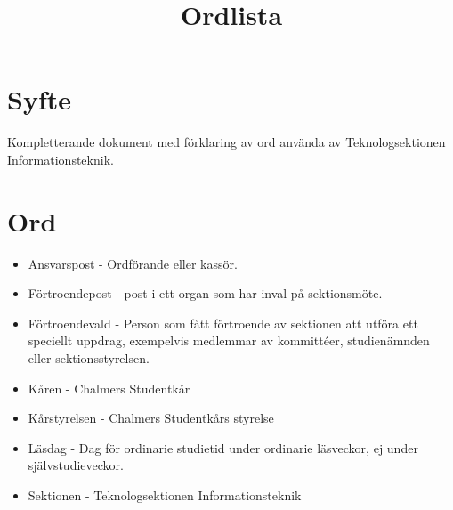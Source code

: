 \documentclass[11pt, includeaddress]{classes/cthit}
\begin{document}
\title{Ordlista}
\maketitle

\thispagestyle{empty}

\newpage

\makeheadfoot%

\setcounter{tocdepth}{2}
\setcounter{page}{1}

\section{Syfte}
Kompletterande dokument med förklaring av ord använda av Teknologsektionen Informationsteknik.

\section{Ord}
\begin{itemize}
	\item Ansvarspost - Ordförande eller kassör.
	\item Förtroendepost - post i ett organ som har inval på sektionsmöte.
	\item Förtroendevald - Person som fått förtroende av sektionen att utföra ett speciellt uppdrag, exempelvis medlemmar av kommittéer, studienämnden eller sektionsstyrelsen.
	\item Kåren - Chalmers Studentkår
	\item Kårstyrelsen - Chalmers Studentkårs styrelse
	\item Läsdag - Dag för ordinarie studietid under ordinarie läsveckor, ej under självstudieveckor.
	\item Sektionen - Teknologsektionen Informationsteknik
\end{itemize}
\end{document}
